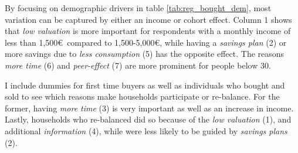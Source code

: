 \documentclass[ProjectABM]{subfiles}
\begin{document}


By focusing on demographic drivers in table \ref{tab:reg_bought_dem}, most variation can be captured by either an income or cohort effect. Column 1 shows that \textit{low valuation} is more important for respondents with a monthly income of less than 1,500\euro\ compared to 1,500-5,000\euro, while having a \textit{savings plan} (2) or more savings due to \textit{less consumption} (5) has the opposite effect. The reasons \textit{more time} (6) and \textit{peer-effect} (7) are more prominent for people below 30.

I include dummies for first time buyers as well as individuals who bought and sold to see which reasons make households participate or re-balance. For the former, having \textit{more time} (3) is very important as well as an increase in income. %
Lastly, households who re-balanced did so because of the \textit{low valuation} (1), and additional \textit{information} (4), while were less likely to be guided by \textit{savings plans} (2).


\end{document}
